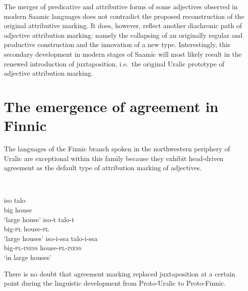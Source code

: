 {The merger of predicative and attributive forms of some adjectives observed in modern Saamic languages does not contradict the proposed reconstruction of the original attributive marking. It does, however, reflect another diachronic path of adjective attribution marking: namely the collapsing of an originally regular and productive construction and the innovation of a new type. Interestingly, this secondary development in modern stages of Saamic will most likely result in the renewed introduction of juxtaposition, i.e.~the original Uralic prototype of adjective attribution marking.

\section[Agreement in Finnic]{The emergence of agreement in Finnic} \label{Finnic diachr}
The languages of the Finnic branch spoken in the northwestern periphery of Uralic are exceptional within this family because they exhibit head-driven agreement as the default type of attribution marking of adjectives.
\begin{exe}
\ex {}\\
\begin{xlist}
\ex
\gll	iso talo\\
	big house\\
\glt	‘large house’
\ex	
\gll	iso-t talo-t\\
	big-\textsc{pl} house-\textsc{pl}\\
\glt	‘large houses’
\ex	
\gll	iso-i-ssa	talo-i-ssa\\
	big-\textsc{pl}-\textsc{iness} house-\textsc{pl}-\textsc{iness}\\
\glt	‘in large houses’
\end{xlist}
\end{exe}
There is no doubt that agreement marking replaced juxtaposition at a certain point during the linguistic development from Proto-Uralic to Proto-Finnic.

}
